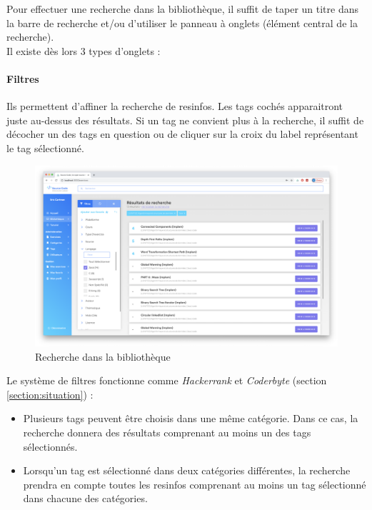 \label{section:panneau}

Pour effectuer une recherche dans la bibliothèque, il suffit de taper un titre dans la barre de recherche et/ou d'utiliser le panneau à onglets (élément central de la recherche).\\

Il existe dès lors 3 types d'onglets :

\paragraph{Filtres} Ils permettent d'affiner la recherche de \glspl{resinfo}. Les \glspl{tag} cochés apparaitront juste au-dessus des résultats. Si un \gls{tag} ne convient plus à la recherche, il suffit de décocher un des tags en question ou de cliquer sur la croix du label représentant le \gls{tag} sélectionné.\\

\begin{figure}[H]
    \includegraphics[width=\textwidth,height=\textheight,keepaspectratio]{images/client/search-library.png}
    \centering
    \caption[SourceCode : recherche dans la bibliothèque]{Recherche dans la bibliothèque}
\end{figure}

Le système de filtres fonctionne comme \textit{Hackerrank} et \textit{Coderbyte} (section \ref{section:situation}) :

\begin{itemize}
    \item Plusieurs \glspl{tag} peuvent être choisis dans une même catégorie. Dans ce cas, la recherche donnera des résultats comprenant au moins un des \glspl{tag} sélectionnés.
    \item Lorsqu'un \gls{tag} est sélectionné dans deux catégories différentes, la recherche prendra en compte toutes les \glspl{resinfo} comprenant au moins un \gls{tag} sélectionné dans chacune des catégories.
\end{itemize}


